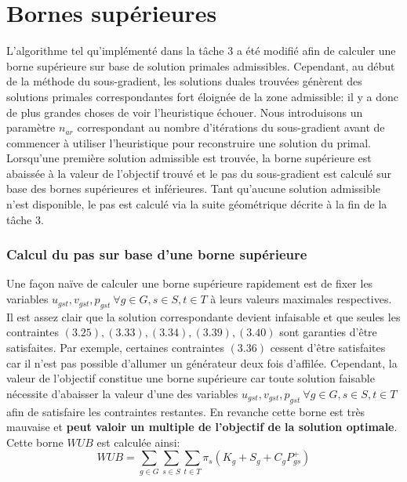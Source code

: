 \section{Bornes supérieures}

L'algorithme tel qu'implémenté dans la tâche 3 a été modifié afin de calculer une borne supérieure sur base de solution primales admissibles.
Cependant, au début de la méthode du sous-gradient, les solutions duales trouvées génèrent des solutions primales
correspondantes fort éloignée de la zone admissible: il y a donc de plus grandes choses de voir l'heuristique échouer.
Nous introduisons un paramètre \textit{$n_{ar}$} correspondant au nombre d'itérations du sous-gradient avant de commencer à utiliser
l'heuristique pour reconstruire une solution du primal. Lorsqu'une première solution admissible est trouvée, la borne supérieure est abaissée
à la valeur de l'objectif trouvé et le pas du sous-gradient est calculé sur base des bornes supérieures et inférieures.
Tant qu'aucune solution admissible n'est disponible, le pas est calculé via la suite géométrique décrite à la fin de la tâche 3.

\subsubsection{Calcul du pas sur base d'une borne supérieure}

Une façon naïve de calculer une borne supérieure rapidement est de fixer les variables
$u_{gst}, v_{gst}, p_{gst} \ \forall g \in G, s \in S, t \in T$ à leurs valeurs maximales respectives.
Il est assez clair que la solution correspondante devient infaisable et que seules les contraintes 
$(3.25), (3.33), (3.34), (3.39), (3.40)$ sont garanties d'être satisfaites. Par exemple, certaines contraintes $(3.36)$ cessent d'être satisfaites
car il n'est pas possible d'allumer un générateur deux fois d'affilée. Cependant, la valeur de l'objectif constitue une borne supérieure
car toute solution faisable nécessite d'abaisser la valeur d'une des variables $u_{gst}, v_{gst}, p_{gst} \ \forall g \in G, s \in S, t \in T$
afin de satisfaire les contraintes restantes. En revanche cette borne est très mauvaise et \textbf{peut valoir un multiple de l'objectif de la solution optimale}.
Cette borne $WUB$ est calculée ainsi:
\begin{equation}
    WUB = \sum\limits_{g \in G} \sum\limits_{s \in S} \sum\limits_{t \in T} \pi_s (K_g + S_g + C_g P_{gs}^{+})
\end{equation}

